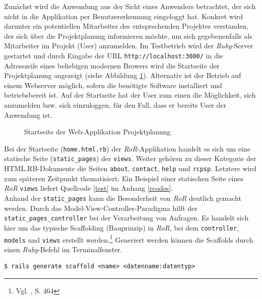 \documentclass[a4paper,12pt,parskip,bibtotoc,liststotoc]{article}
\begin{document}
Zunächst wird die Anwendung aus der Sicht eines Anwenders betrachtet, der sich nicht in die Applikation per Benutzererkennung eingeloggt hat. Konkret wird darunter ein potentiellen Mitarbeiter des entsprechenden Projektes verstanden, der sich über die Projektplanung informieren möchte, um sich gegebenenfalls als Mitarbeiter im Projekt (User) anzumelden. Im Testbetrieb wird der \textit{Ruby}-Server gestartet und durch Eingabe der URL \texttt{http://localhost:3000/} in die Adresszeile eines beliebigen modernen Browers wird die Startseite der Projektplanung angezeigt (siehe Abbildung \ref{Start}). Alternativ ist der Betrieb auf einem Webserver möglich, sofern die benötigte Software installiert und betriebsbereit ist. Auf der Startseite hat der User zum einen die Möglichkeit, sich anzumelden bzw. sich einzuloggen, für den Fall, dass er bereits User der Anwendung ist. \\

\begin{figure}[h!]
  \begin{center}
    \caption{Startseite der Web-Applikation Projektplanung}  \label{Start}
  \end{center}
\end{figure}

Bei der Startseite (\texttt{home.html.rb}) der \textit{RoR}-Applikation handelt es sich um eine statische Seite (\texttt{static\_pages}) der \texttt{views}. Weiter gehören zu dieser Kategorie der HTML.RB-Dokumente die Seiten \texttt{about}, \texttt{contact}, \texttt{help} und \texttt{rcpsp}. Letztere wird zum späteren Zeitpunkt thematisiert. Ein Beispiel einer statischen Seite eines \textit{RoR} \texttt{views} liefert Quellcode \ref{test} im Anhang \ref{rcodes}.\\

Anhand der \texttt{static\_pages} kann die Besonderheit von \textit{RoR} deutlich gemacht werden. Durch das Model-View-Controller-Paradigma hilft der \texttt{static\_pages\_controller} bei der Verarbeitung von Anfragen. Es handelt sich hier um das typische Scaffolding (Bauprinzip) in \textit{RoR}, bei dem \texttt{controller}, \texttt{models} und \texttt{views} erstellt werden.\footnote{Vgl. \cite{walter2008ruby}, S. 464} Generiert werden können die Scaffolds durch  einen \textit{Ruby}-Befehl im Terminalfenster.
\begin{lstlisting}[style=Befehl]
$ rails generate scaffold <name> <datenname:datentyp> 
\end{lstlisting}
\end{document}

